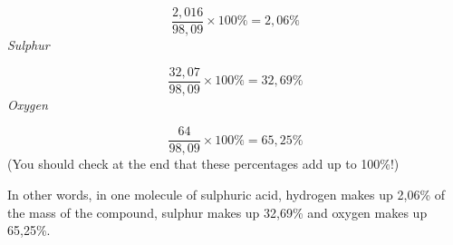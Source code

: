 {\begin{mdframed}[linewidth=4, leftmargin=40, rightmargin=40]
\begin{exercise}
\begin{enumerate}[noitemsep, label=\textbf{Step} \textbf{\arabic*}. ]
    \begin{equation}
    \frac{2,016}{98,09}\ensuremath{\times}100\%=2,06\%\tag{18.20}
      \end{equation}
      \label{m38712*id280780}
        \textsl{Sulphur}
      \par 
      \label{m38712*id280786}\nopagebreak\noindent{}
        
    \begin{equation}
    \frac{32,07}{98,09}\ensuremath{\times}100\%=32,69\%\tag{18.21}
      \end{equation}
      \label{m38712*id280831}
        \textsl{Oxygen}
      \par 
      \label{m38712*id280837}\nopagebreak\noindent{}
        
    \begin{equation}
    \frac{64}{98,09}\ensuremath{\times}100\%=65,25\%\tag{18.22}
      \end{equation}
      \label{m38712*id280876}(You should check at the end that these percentages add up to 100\%!)\par 
      \label{m38712*id280880}In other words, in one molecule of sulphuric acid, hydrogen makes up 2,06\% of the mass of the compound, sulphur makes up 32,69\% and oxygen makes up 65,25\%.\par 
\end{enumerate}
    \end{exercise}
    \end{mdframed}
    }
    \noindent
\label{m38712*secfhsst!!!underscore!!!id1029}\vspace{.5cm} 
      \noindent
